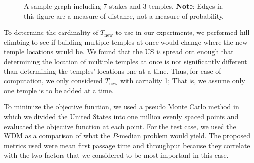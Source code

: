 \documentclass[twoside,twocolumn]{article}
\begin{document}
\begin{figure}[h!]
\centering
{}
\caption{A sample graph including $7$ stakes and $3$ temples. \textbf{Note}: Edges in this figure are a measure of distance, not a measure of probability.} %
\label{fig:M1}
\end{figure}

To determine the cardinality of $T_{\text{new}}$ to use in our experiments, we performed hill climbing to see if building multiple temples at once would change where the new temple locations would be. %
We found that the US is spread out enough that determining the location of multiple temples at once is not significantly different than determining the temples' locations one at a time.
Thus, for ease of computation, we only considered $T_{\text{new}}$ with carnality 1;
That is, we assume only one temple is to be added at a time.

To minimize the objective function, we used a pseudo Monte Carlo method in which we divided the United States into one million evenly spaced points and evaluated the objective function at each point.
For the test case, we used the WDM as a comparison of what the $P$-median problem would yield.
The proposed metrics used were mean first passage time and throughput because they correlate with the two factors that we considered to be most important in this case.
\end{document}
